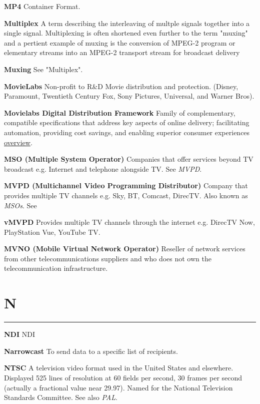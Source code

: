 \smallskip
\textbf{MP4}
Container Format.

\smallskip
\textbf{Multiplex}
A term describing the interleaving of multple signals together into a single signal. Multiplexing is often shortened even further to the term "muxing" and a pertient example of muxing is the conversion of MPEG-2 program or elementary streams into an MPEG-2 transport stream for broadcast delivery

\smallskip
\textbf{Muxing}
See "Multiplex".

\smallskip
\textbf{MovieLabs}
Non-profit to R\&D Movie distribution and protection. (Disney, Paramount, Twentieth Century Fox, Sony Pictures, Universal, and Warner Bros).

\smallskip
\textbf{Movielabs Digital Distribution Framework}
Family of complementary, compatible specifications that address key aspects of online delivery; facilitating automation, providing cost savings, and enabling superior consumer experiences \href{https://movielabs.com/md/}{overview}.

\smallskip
\textbf{MSO (Multiple System Operator)}
Companies that offer services beyond TV broadcast e.g. Internet and telephone alongside TV.  See \textit{MVPD}.


\smallskip
\textbf{MVPD (Multichannel Video Programming Distributor)}
Company that provides multiple TV channels e.g. Sky, BT, Comcast, DirecTV. Also known as \textit{MSOs}. See

\smallskip
\textbf{vMVPD}
Provides multiple TV channels through the internet e.g. DirecTV Now, PlayStation Vue, YouTube TV.

\smallskip
\textbf{MVNO (Mobile Virtual Network Operator)}
Reseller of network services from other telecommunications suppliers and who does not own the telecommunication infrastructure.


\section{N}
\hrule

\medskip
\textbf{NDI}
NDI

\smallskip
\textbf{Narrowcast}
To send data to a specific list of recipients.

\smallskip
\textbf{NTSC}
A television video format used in the United States and elsewhere. Displayed 525 lines of resolution at 60 fields per second, 30 frames per second (actually a fractional value near 29.97). Named for the National Television Standards Committee. See also \textit{PAL}.


